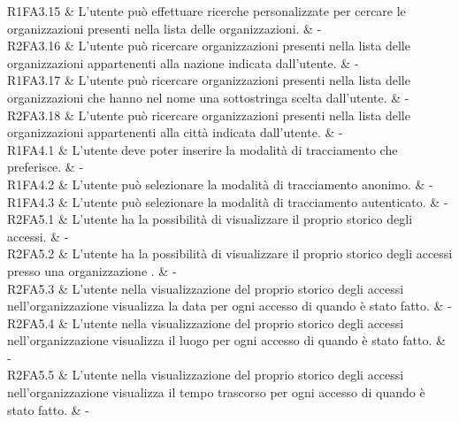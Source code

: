 R1FA3.15 & L’utente può effettuare ricerche personalizzate per cercare le organizzazioni presenti nella lista delle organizzazioni.  & - \\

R2FA3.16 & L’utente può ricercare organizzazioni presenti nella lista delle organizzazioni appartenenti alla nazione indicata dall’utente. & - \\

R1FA3.17 & L’utente può ricercare organizzazioni presenti nella lista delle organizzazioni che hanno nel nome una sottostringa scelta dall'utente.  & - \\

R2FA3.18 & L’utente può ricercare organizzazioni presenti nella lista delle organizzazioni appartenenti alla città indicata dall’utente.  & - \\

R1FA4.1 & L’utente deve poter inserire la modalità di tracciamento che preferisce. & - \\

R1FA4.2 & L’utente può selezionare la modalità di tracciamento anonimo. & - \\

R1FA4.3 & L’utente può selezionare la modalità di tracciamento autenticato. & - \\

R2FA5.1 & L’utente ha la possibilità di visualizzare il proprio storico degli accessi.  & - \\

R2FA5.2 & L’utente ha la possibilità di visualizzare il proprio storico degli accessi presso una organizzazione .  & - \\

R2FA5.3 & L'utente nella visualizzazione del proprio storico degli accessi nell'organizzazione visualizza la data per ogni accesso di quando è stato fatto. & - \\

R2FA5.4 & L'utente nella visualizzazione del proprio storico degli accessi nell'organizzazione visualizza il luogo per ogni accesso di quando è stato fatto.  & - \\

R2FA5.5 & L'utente nella visualizzazione del proprio storico degli accessi nell'organizzazione visualizza il tempo trascorso per ogni accesso di quando è stato fatto.  & - \\

